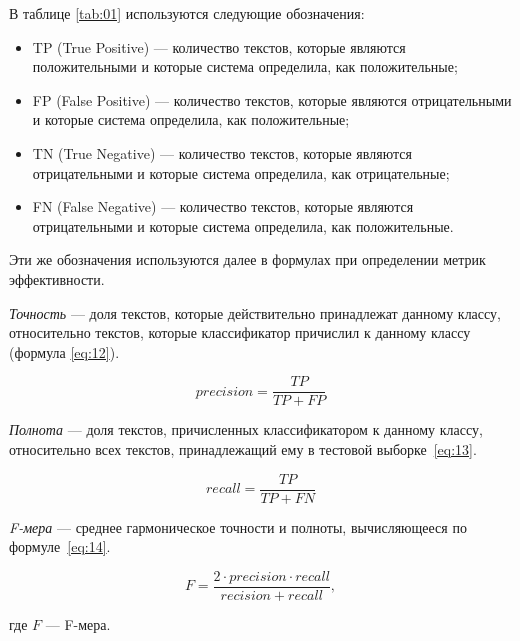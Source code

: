 В таблице \ref{tab:01} используются следующие обозначения:
\begin{itemize}
    \item TP (True Positive) --- количество текстов, которые являются
        положительными и которые система определила, как положительные;
    \item FP (False Positive) --- количество текстов, которые являются
        отрицательными и которые система определила, как положительные;
    \item TN (True Negative) --- количество текстов, которые являются
        отрицательными и которые система определила, как отрицательные;
    \item FN (False Negative) --- количество текстов, которые являются
        отрицательными и которые система определила, как положительные.
\end{itemize}

Эти же обозначения используются далее в формулах при определении метрик
эффективности.

\textit{Точность} --- доля текстов, которые действительно принадлежат данному
классу, относительно текстов, которые классификатор причислил к данному
классу (формула \ref{eq:12}).

\begin{equation}\label{eq:12}
    precision = \frac{TP}{TP + FP}
\end{equation}

\textit{Полнота} --- доля текстов, причисленных классификатором к
данному классу, относительно всех текстов, принадлежащий ему в тестовой
выборке~\ref{eq:13}.

\begin{equation}\label{eq:13}
    recall = \frac{TP}{TP + FN}
\end{equation}

\textit{F-мера} --- среднее гармоническое точности и полноты, вычисляющееся
по формуле~\ref{eq:14}.

\begin{equation}\label{eq:14}
    F = \frac{2 \cdot precision \cdot recall}{recision + recall},
\end{equation}

где $F$ --- F-мера.

